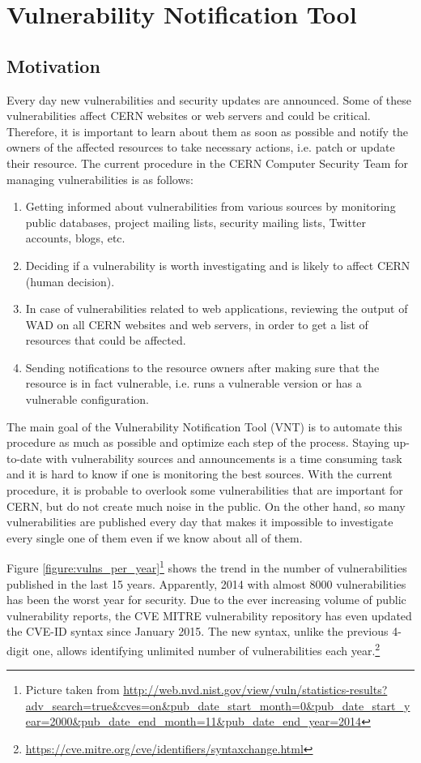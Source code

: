 \chapter{Vulnerability Notification Tool}
\label{vulnerability-notification-tool}
\thispagestyle{empty}

\section{Motivation}
Every day new vulnerabilities and security updates are announced. Some of these vulnerabilities affect CERN websites or web servers and could be critical. Therefore, it is important to learn about them as soon as possible and notify the owners of the affected resources to take necessary actions, i.e. patch or update their resource. The current procedure in the CERN Computer Security Team for managing vulnerabilities is as follows:
\begin{enumerate}
\item Getting informed about vulnerabilities from various sources by monitoring public databases, project mailing lists, security mailing lists, Twitter accounts, blogs, etc.
\item Deciding if a vulnerability is worth investigating and is likely to affect CERN (human decision).
\item In case of vulnerabilities related to web applications, reviewing the output of WAD on all CERN websites and web servers, in order to get a list of resources that could be affected.
\item Sending notifications to the resource owners after making sure that the resource is in fact vulnerable, i.e. runs a vulnerable version or has a vulnerable configuration.
\end{enumerate}

The main goal of the Vulnerability Notification Tool (VNT) is to automate this procedure as much as possible and optimize each step of the process. Staying up-to-date with vulnerability sources and announcements is a time consuming task and it is hard to know if one is monitoring the best sources. With the current procedure, it is probable to overlook some vulnerabilities that are important for CERN, but do not create much noise in the public. 
On the other hand, so many vulnerabilities are published every day that makes it impossible to investigate every single one of them even if we know about all of them.

Figure \ref{figure:vulns_per_year}\footnote{Picture taken from \url{http://web.nvd.nist.gov/view/vuln/statistics-results?adv_search=true&cves=on&pub_date_start_month=0&pub_date_start_year=2000&pub_date_end_month=11&pub_date_end_year=2014}} shows the trend in the number of vulnerabilities published in the last 15 years. Apparently, 2014 with almost 8000 vulnerabilities has been the worst year for security. Due to the ever increasing volume of public vulnerability reports, the CVE MITRE vulnerability repository has even updated the CVE-ID syntax since January 2015. The new syntax, unlike the previous 4-digit one, allows identifying unlimited number of vulnerabilities each year.\footnote{\url {https://cve.mitre.org/cve/identifiers/syntaxchange.html}} 
